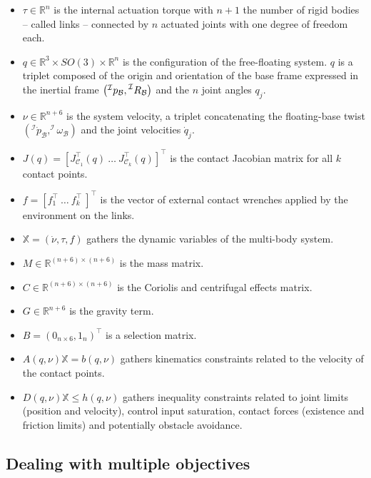 \documentclass[12pt,a4paper,twoside]{article}
\begin{document}
\begin{itemize}
\item $\tau \in \mathbb{R}^n$ is the internal actuation torque with $n + 1$ the number of rigid bodies -- called links -- connected by $n$ actuated joints with one degree of freedom each.
\item ${q} \in \mathbb{R}^3 \times SO(3)\times \mathbb{R}^n$ is the configuration of the free-floating system. $q$ is a triplet composed of the origin and orientation of the base frame expressed in the inertial frame $\left(\prescript{\mathcal{I}}{}p_{\mathcal{B}},\prescript{\mathcal{I}}{}R_{\mathcal{B}}\right)$ and the $n$ joint angles $q_j$.
\item ${\nu} \in \mathbb{R}^{n+6}$ is the system velocity, a triplet concatenating the floating-base twist $\left (^\mathcal{I}\dot{ p}_{\mathcal{B}},^\mathcal{I}\omega_{\mathcal{B}}\right)$ and the joint velocities ${\dot{q}}_j$.
\item ${J}({q})= \left[{J}^\top _{\mathcal{C}_1}({q})~ \dots~ {J}^\top _{\mathcal{C}_k}({q}) \right]^\top$ is the contact Jacobian matrix for all $k$ contact points.
\item $f= \left[ {f}^\top_{1}~ \dots~ {f}^\top_{k}~ \right]^\top $ is the vector of external contact wrenches applied by the environment on the links.
\item $\mathbb{X} = \left(\dot{\nu}, \tau, f \right)$ gathers the dynamic variables of the multi-body system.
\item ${M} \in \mathbb{R}^{(n+6) \times (n+6)}$ is the mass matrix.
\item ${C} \in \mathbb{R}^{(n+6) \times (n+6)}$ is the Coriolis and centrifugal effects matrix.
\item ${G} \in \mathbb{R}^{n+6}$ is the gravity term.
\item $B = (0_{n\times 6} , 1_n)^\top$ is a selection matrix.
\item ${A}(q,\nu) \mathbb{X}   =  {b}(q,\nu)$ gathers kinematics constraints related to the velocity of the contact points.
\item ${D}(q,\nu) \mathbb{X} \leq {h}(q,\nu)$ gathers inequality constraints related to joint limits (position and velocity), control input saturation, contact forces (existence and friction limits) and potentially obstacle avoidance.
\end{itemize}

\subsection{Dealing with multiple objectives}
\end{document}
